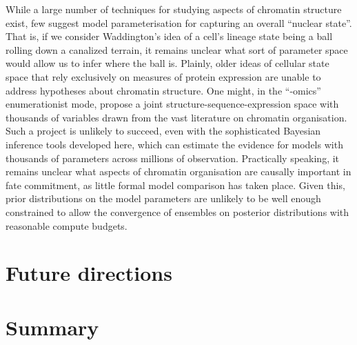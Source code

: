 While a large number of techniques for studying aspects of chromatin structure exist, few suggest model parameterisation for capturing an overall ``nuclear state''. That is, if we consider Waddington's idea of a cell's lineage state being a ball rolling down a canalized terrain, it remains unclear what sort of parameter space would allow us to infer where the ball is. Plainly, older ideas of cellular state space that rely exclusively on measures of protein expression are unable to address hypotheses about chromatin structure. One might, in the ``-omics'' enumerationist mode, propose a joint structure-sequence-expression space with thousands of variables drawn from the vast literature on chromatin organisation. Such a project is unlikely to succeed, even with the sophisticated Bayesian inference tools developed here, which can estimate the evidence for models with thousands of parameters across millions of observation. Practically speaking, it remains unclear what aspects of chromatin organisation are causally important in fate commitment, as little formal model comparison has taken place. Given this, prior distributions on the model parameters are unlikely to be well enough constrained to allow the convergence of ensembles on posterior distributions with reasonable compute budgets.



\section{Future directions}



\section{Summary}